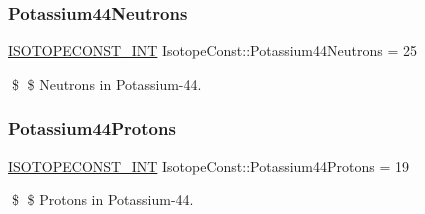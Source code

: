 \subsubsection{\texorpdfstring{Potassium44\+Neutrons}{Potassium44Neutrons}}
{\footnotesize\ttfamily \mbox{\hyperlink{group___isotope_const-_macros_ga5f18360b3e99483a35c32d789e62621c}{I\+S\+O\+T\+O\+P\+E\+C\+O\+N\+S\+T\+\_\+\+I\+NT}} Isotope\+Const\+::\+Potassium44\+Neutrons = 25}

\$ \$ Neutrons in Potassium-\/44. \mbox{\label{group___isotope_const-_potassium-_k44_ga743baf968a80d8b2ea2920a445907445}} 
\subsubsection{\texorpdfstring{Potassium44\+Protons}{Potassium44Protons}}
{\footnotesize\ttfamily \mbox{\hyperlink{group___isotope_const-_macros_ga5f18360b3e99483a35c32d789e62621c}{I\+S\+O\+T\+O\+P\+E\+C\+O\+N\+S\+T\+\_\+\+I\+NT}} Isotope\+Const\+::\+Potassium44\+Protons = 19}

\$ \$ Protons in Potassium-\/44. 